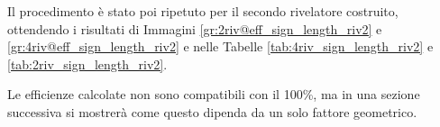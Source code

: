 Il procedimento \`e stato poi ripetuto per il secondo rivelatore costruito, ottendendo i risultati di Immagini \ref{gr:2riv@eff_sign_length_riv2} e \ref{gr:4riv@eff_sign_length_riv2} e nelle Tabelle \ref{tab:4riv_sign_length_riv2} e \ref{tab:2riv_sign_length_riv2}.

Le efficienze calcolate non sono compatibili con il 100\%, ma in una sezione successiva si mostrer\`a come questo dipenda da un solo fattore geometrico.
